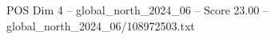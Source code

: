 \begin{textsample}{POS Dim 4 – global\_north\_2024\_06 – Score 23.00 – global\_north\_2024\_06/108972503.txt}
\end{textsample}
